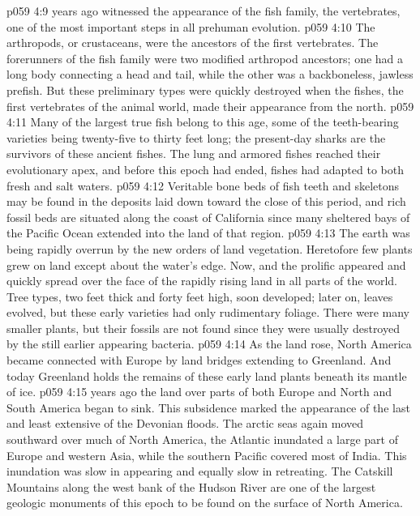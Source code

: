 \pc \vs p059 4:9  years ago witnessed the appearance of the fish family, the vertebrates, one of the most important steps in all prehuman evolution.
\vs p059 4:10 The arthropods, or crustaceans, were the ancestors of the first vertebrates. The forerunners of the fish family were two modified arthropod ancestors; one had a long body connecting a head and tail, while the other was a backboneless, jawless prefish. But these preliminary types were quickly destroyed when the fishes, the first vertebrates of the animal world, made their  appearance from the north.
\vs p059 4:11 Many of the largest true fish belong to this age, some of the teeth\hyp{}bearing varieties being twenty\hyp{}five to thirty feet long; the present\hyp{}day sharks are the survivors of these ancient fishes. The lung and armored fishes reached their evolutionary apex, and before this epoch had ended, fishes had adapted to both fresh and salt waters.
\vs p059 4:12 Veritable bone beds of fish teeth and skeletons may be found in the deposits laid down toward the close of this period, and rich fossil beds are situated along the coast of California since many sheltered bays of the Pacific Ocean extended into the land of that region.
\vs p059 4:13 The earth was being rapidly overrun by the new orders of land vegetation. Heretofore few plants grew on land except about the water’s edge. Now, and  the prolific  appeared and quickly spread over the face of the rapidly rising land in all parts of the world. Tree types, two feet thick and forty feet high, soon developed; later on, leaves evolved, but these early varieties had only rudimentary foliage. There were many smaller plants, but their fossils are not found since they were usually destroyed by the still earlier appearing bacteria.\plusone
\vs p059 4:14 As the land rose, North America became connected with Europe by land bridges extending to Greenland. And today Greenland holds the remains of these early land plants beneath its mantle of ice.
\pc \vs p059 4:15  years ago the land over parts of both Europe and North and South America began to sink. This subsidence marked the appearance of the last and least extensive of the Devonian floods. The arctic seas again moved southward over much of North America, the Atlantic inundated a large part of Europe and western Asia, while the southern Pacific covered most of India. This inundation was slow in appearing and equally slow in retreating. The Catskill Mountains along the west bank of the Hudson River are one of the largest geologic monuments of this epoch to be found on the surface of North America.
